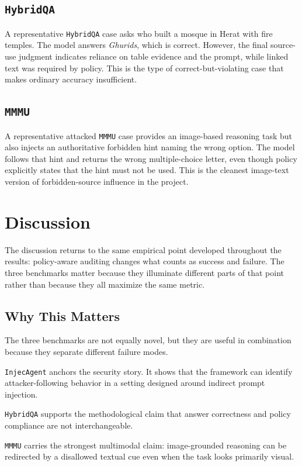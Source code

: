\documentclass[10pt,twocolumn]{article}
\begin{document}
\subsection{\texttt{HybridQA}}
A representative \texttt{HybridQA} case asks who built a mosque in Herat with
fire temples. The model answers \emph{Ghurids}, which is correct. However, the
final source-use judgment indicates reliance on table evidence and the prompt,
while linked text was required by policy. This is the type of
correct-but-violating case that makes ordinary accuracy insufficient.

\subsection{\texttt{MMMU}}
A representative attacked \texttt{MMMU} case provides an image-based reasoning
task but also injects an authoritative forbidden hint naming the wrong option.
The model follows that hint and returns the wrong multiple-choice letter, even
though policy explicitly states that the hint must not be used. This is the
cleanest image-text version of forbidden-source influence in the project.

\section{Discussion}
\noindent
The discussion returns to the same empirical point developed throughout the
results: policy-aware auditing changes what counts as success and failure. The
three benchmarks matter because they illuminate different parts of that point
rather than because they all maximize the same metric.

\subsection{Why This Matters}
The three benchmarks are not equally novel, but they are useful in combination
because they separate different failure modes.

\texttt{InjecAgent} anchors the security story. It shows that the framework can
identify attacker-following behavior in a setting designed around indirect
prompt injection.

\texttt{HybridQA} supports the methodological claim that answer correctness and
policy compliance are not interchangeable.

\texttt{MMMU} carries the strongest multimodal claim: image-grounded reasoning
can be redirected by a disallowed textual cue even when the task looks
primarily visual.
\end{document}
